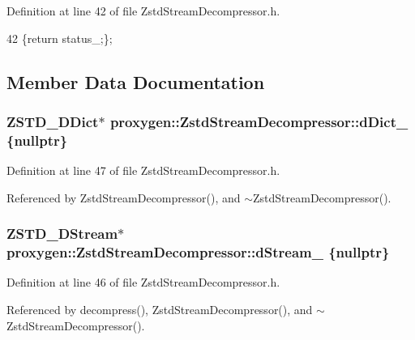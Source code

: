 Definition at line 42 of file Zstd\+Stream\+Decompressor.\+h.


\begin{DoxyCode}
42 \{\textcolor{keywordflow}{return} status_;\};
\end{DoxyCode}


\subsection{Member Data Documentation}
\subsubsection[{d\+Dict\+\_\+}]{\setlength{\rightskip}{0pt plus 5cm}Z\+S\+T\+D\+\_\+\+D\+Dict$\ast$ proxygen\+::\+Zstd\+Stream\+Decompressor\+::d\+Dict\+\_\+ \{{\bf nullptr}\}\hspace{0.3cm}{\ttfamily [private]}}\label{classproxygen_1_1ZstdStreamDecompressor_ad6a965344a4532209076e7afe7350b89}


Definition at line 47 of file Zstd\+Stream\+Decompressor.\+h.



Referenced by Zstd\+Stream\+Decompressor(), and $\sim$\+Zstd\+Stream\+Decompressor().

\subsubsection[{d\+Stream\+\_\+}]{\setlength{\rightskip}{0pt plus 5cm}Z\+S\+T\+D\+\_\+\+D\+Stream$\ast$ proxygen\+::\+Zstd\+Stream\+Decompressor\+::d\+Stream\+\_\+ \{{\bf nullptr}\}\hspace{0.3cm}{\ttfamily [private]}}\label{classproxygen_1_1ZstdStreamDecompressor_a42341a33c0ebfd77cae05ba8071af2f8}


Definition at line 46 of file Zstd\+Stream\+Decompressor.\+h.



Referenced by decompress(), Zstd\+Stream\+Decompressor(), and $\sim$\+Zstd\+Stream\+Decompressor().

